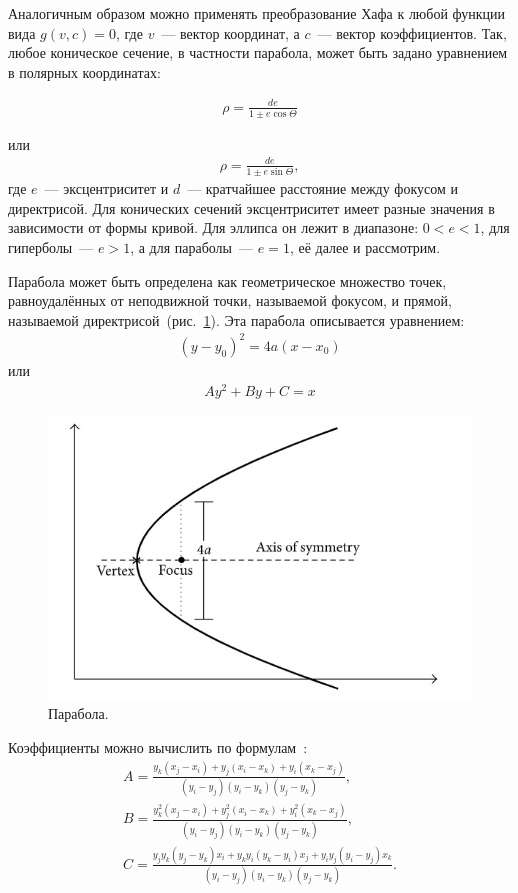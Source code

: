 \documentclass[12pt,a4paper]{article} %
\begin{document}
Аналогичным образом можно применять преобразование Хафа к любой функции вида $g(v,c) = 0$, где $v$~--- вектор координат, а $c$~--- вектор коэффициентов.
Так, любое коническое сечение, в частности парабола, может быть задано уравнением в полярных координатах:

\begin{gather}\label{conic}
	\rho = \frac{de}{1\pm e\cos{\Theta}}
\end{gather}

или
\begin{gather}\label{conic2}
	\rho = \frac{de}{1\pm e\sin{\Theta}},
\end{gather}
где $e$~--- эксцентриситет и $d$~--- кратчайшее расстояние между фокусом и директрисой. Для конических сечений эксцентриситет имеет разные значения в зависимости от формы кривой. Для эллипса он лежит в диапазоне: $0<e<1$, для гиперболы~--- $e>1$, а для параболы~--- $e = 1$, её далее и рассмотрим.

Парабола может быть определена как геометрическое множество точек, равноудалённых от неподвижной точки, называемой фокусом, и прямой, называемой директрисой~(рис.~\ref{fig:hough_parab}). Эта парабола описывается уравнением:
\begin{gather}\label{parab_equ}
	(y-y_0)^2 = 4a(x-x_0)
\end{gather}
 или
 \begin{gather}\label{parab_equ_2}
 	Ay^2+By+C=x
 \end{gather}
\begin{figure}[h]
	
	\centering
	
	\includegraphics[width=0.6\linewidth]{hough_parab.jpg}
	
	\caption{Парабола.}
	
	\label{fig:hough_parab}
	
\end{figure}

Коэффициенты можно вычислить по формулам~\cite{Hough_Parab}: 
 \begin{gather}\label{parab_equ_3}
	A=\frac{y_k(x_j-x_i)+y_j(x_i-x_k)+y_i(x_k-x_j)}{(y_i-y_j)(y_i-y_k)(y_j-y_k)},\\
	B=\frac{y_k^2(x_j-x_i)+y_j^2(x_i-x_k)+y_i^2(x_k-x_j)}{(y_i-y_j)(y_i-y_k)(y_j-y_k)},\\
	C= \frac{y_jy_k(y_j-y_k)x_i+y_ky_i(y_k-y_i)x_j+y_iy_j(y_i-y_j)x_k}{(y_i-y_j)(y_i-y_k)(y_j-y_k)}.
\end{gather}
\end{document}
